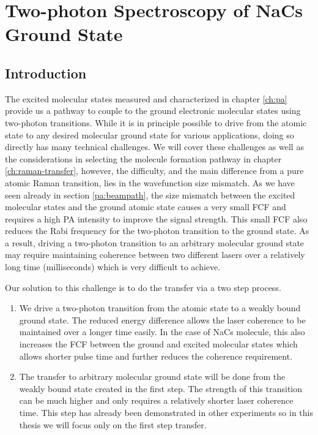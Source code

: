 
\chapter{Two-photon Spectroscopy of NaCs Ground State}
\label{ch:raman-spectroscopy}

\section{Introduction}


The excited molecular states measured and characterized in chapter \ref{ch:pa}
provide us a pathway to couple to the ground electronic molecular states
using two-photon transitions.
While it is in principle possible to drive from the atomic state
to any desired molecular ground state for various applications,
doing so directly has many technical challenges.
We will cover these challenges as well as the considerations in selecting
the molecule formation pathway in chapter \ref{ch:raman-transfer},
however, the difficulty, and the main difference from a pure atomic Raman transition,
lies in the wavefunction size mismatch.
As we have seen already in section \ref{pa:beampath},
the size mismatch between the excited molecular states and the ground atomic state
causes a very small FCF and requires a high PA intensity to improve the signal strength.
This small FCF also reduces the Rabi frequency for the two-photon transition to the ground state.
As a result, driving a two-photon transition to an arbitrary molecular ground state
may require maintaining coherence between two different lasers over
a relatively long time (milliseconds) which is very difficult to achieve.

Our solution to this challenge is to do the transfer via a two step process.
\begin{enumerate}
\item We drive a two-photon transition from the atomic state to
  a weakly bound ground state.
  The reduced energy difference allows the laser coherence to be maintained
  over a longer time easily.
  In the case of NaCs molecule, this also increases the FCF
  between the ground and excited molecular states which allows shorter pulse time and
  further reduces the coherence requirement.
\item The transfer to arbitrary molecular ground state will be done from
  the weakly bound state created in the first step.
  The strength of this transition can be much higher
  and only requires a relatively shorter laser coherence time.
  This step has already been demonstrated in other experiments\todo{\cite{}}
  so in this thesis we will focus only on the first step transfer.
\end{enumerate}

